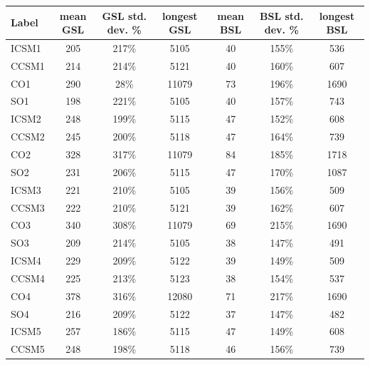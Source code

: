 \begin{table}
  \begin{tabular}{| l | c | c | c | c | c | c |}\hline
    Label & mean GSL & GSL std. dev. \% & longest GSL & mean BSL & BSL std. dev. \% & longest BSL  \\\hline
    ICSM1 & 205 & 217\% & 5105 & 40 & 155\% & 536 \\\hline
    CCSM1 & 214 & 214\% & 5121 & 40 & 160\% & 607 \\\hline
    CO1 & 290 & 28\% & 11079 & 73 & 196\% & 1690 \\\hline
    SO1 & 198 & 221\% & 5105 & 40 & 157\% & 743 \\\hline
%
    ICSM2 & 248 & 199\% & 5115 & 47 & 152\% & 608 \\\hline
    CCSM2 &245 & 200\% & 5118 & 47 & 164\% & 739 \\\hline
    CO2 & 328 & 317\% & 11079 & 84 & 185\% & 1718 \\\hline
    SO2 & 231 & 206\% & 5115 & 47 & 170\% & 1087 \\\hline
%
    ICSM3 & 221 & 210\% & 5105 & 39 & 156\% & 509 \\\hline
    CCSM3 & 222 & 210\% & 5121 & 39 & 162\% & 607 \\\hline
    CO3 & 340 & 308\% & 11079 & 69 & 215\% & 1690 \\\hline
    SO3 & 209 & 214\% & 5105 & 38 & 147\% & 491 \\\hline
%
    ICSM4 & 229 & 209\% & 5122 & 39 & 149\% & 509 \\\hline
    CCSM4 & 225 & 213\% & 5123 & 38 & 154\% & 537 \\\hline
    CO4 & 378 & 316\% & 12080 & 71 & 217\% & 1690 \\\hline
    SO4 & 216 & 209\% & 5122 & 37 & 147\% & 482 \\\hline
%
    ICSM5 & 257 & 186\% & 5115 & 47 & 149\% & 608 \\\hline
    CCSM5 & 248 & 198\% & 5118 & 46 & 156\% & 739 \\\hline

\end{tabular}
\end{table}

